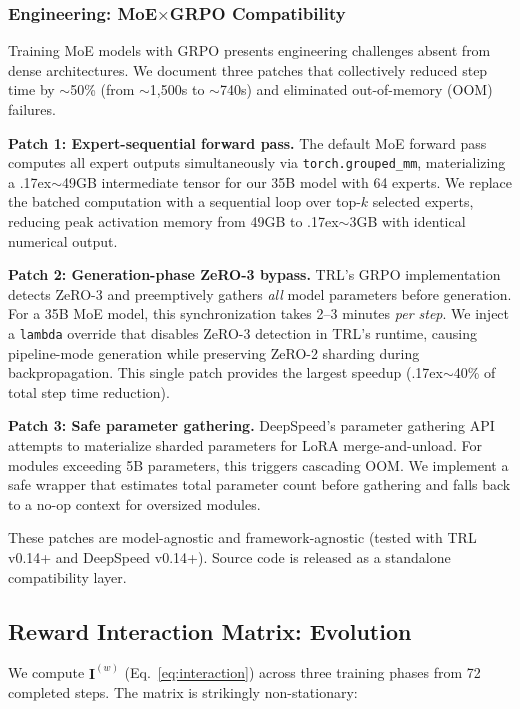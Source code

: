 \documentclass[sigconf]{acmart}
\begin{document}
\subsubsection{Engineering: MoE$\times$GRPO Compatibility}
\label{sec:moe_patches}

Training MoE models with GRPO presents engineering challenges absent from dense architectures. We document three patches that collectively reduced step time by $\sim$50\% (from $\sim$1{,}500s to $\sim$740s) and eliminated out-of-memory (OOM) failures.

\textbf{Patch 1: Expert-sequential forward pass.} The default MoE forward pass computes all expert outputs simultaneously via \texttt{torch.grouped\_mm}, materializing a {\raise.17ex\hbox{$\scriptstyle\sim$}}49GB intermediate tensor for our 35B model with 64 experts. We replace the batched computation with a sequential loop over top-$k$ selected experts, reducing peak activation memory from 49GB to {\raise.17ex\hbox{$\scriptstyle\sim$}}3GB with identical numerical output.

\textbf{Patch 2: Generation-phase ZeRO-3 bypass.} TRL's GRPO implementation detects ZeRO-3 and preemptively gathers \textit{all} model parameters before generation. For a 35B MoE model, this synchronization takes 2--3 minutes \textit{per step}. We inject a \texttt{lambda} override that disables ZeRO-3 detection in TRL's runtime, causing pipeline-mode generation while preserving ZeRO-2 sharding during backpropagation. This single patch provides the largest speedup ({\raise.17ex\hbox{$\scriptstyle\sim$}}40\% of total step time reduction).

\textbf{Patch 3: Safe parameter gathering.} DeepSpeed's parameter gathering API attempts to materialize sharded parameters for LoRA merge-and-unload. For modules exceeding 5B parameters, this triggers cascading OOM. We implement a safe wrapper that estimates total parameter count before gathering and falls back to a no-op context for oversized modules.

These patches are model-agnostic and framework-agnostic (tested with TRL v0.14+ and DeepSpeed v0.14+). Source code is released as a standalone compatibility layer.


\subsection{Reward Interaction Matrix: Evolution}

We compute $\mathbf{I}^{(w)}$ (Eq.~\ref{eq:interaction}) across three training phases from 72 completed steps. The matrix is strikingly non-stationary:
\end{document}
